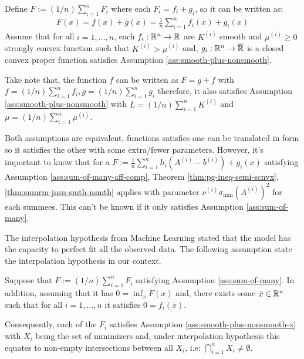 \documentclass[12pt]{article}
\begin{document}
    \begin{assumption}\label{ass:sum-of-many}
        Define $F := (1/n)\sum_{i = 1}^{n} F_i$ where each $F_i = f_i + g_i$, so it can be written as: 
        \begin{align*}
            F(x) = f(x) + g(x) = \frac{1}{n}\sum_{i = 1}^{n} f_i(x) + g_i(x)
        \end{align*}
        Assume that for all $i = 1, \ldots, n$, each $f_i:\mathbb R^n \rightarrow \mathbb R$ are $K^{(i)}$ smooth and $\mu^{(i)} \ge 0$ strongly convex function such that $K^{(i)} > \mu^{(i)}$ and, $g_i:\mathbb R^n \rightarrow \overline {\mathbb R}$ is a closed convex proper function satisfies Assumption \ref{ass:smooth-plus-nonsmooth}. 
        \par 
        Take note that, the function $f$ can be written as $F = g + f$ with $f = (1/n)\sum_{i = 1}^{n} f_i, g = (1/n)\sum_{i = 1}^{n}g_i$ therefore, it also satisfies Assumption \ref{ass:smooth-plus-nonsmooth} with $L = (1/n)\sum_{i = 1}^n K^{(i)}$ and $\mu = (1/n)\sum_{i = 1}^{n}\mu^{(i)}$. 
    \end{assumption}
    Both assumptions are equivalent, functions satisfies one can be translated in form so it satisfies the other with some extra/fewer parameters. 
    However, it's important to know that for a $F := \frac{1}{n}\sum_{i = 1}^{n} h_i(A^{(i)} - b^{(i)}) + g_i(x)$ satisfying Assumption \ref{ass:sum-of-many-aff-comp}, Theorem \ref{thm:pg-ineq-semi-scnvx}, \ref{thm:smnrm-jnsn-smth-nsmth} applies with parameter $\nu^{(i)}\sigma_{\min}(A^{(i)})^2$ for each summees. 
    This can't be known if it only satisfies Assumption \ref{ass:sum-of-many}. 
    \par
    The interpolation hypothesis from Machine Learning stated that the model has the capacity to perfect fit all the observed data. 
    The following assumption state the interpolation hypothesis in our context. 
    \begin{assumption}\label{ass:interp-hypothesis}
        Suppose that $F := (1/n)\sum_{i = 1}^{n} F_i$ satisfying Assumption \ref{ass:sum-of-many}. 
        In addition, assuming that it has $0 = \inf_{x}F(x)$ and, there exists some $\bar x \in \mathbb R^n$ such that for all $i = 1, \ldots, n$ it satisfies $0 = f_i(\bar x)$. 
        \par
        Consequently, each of the $F_i$ satisfies Assumption \ref{ass:smooth-plus-nonsmooth-x} with $X_i$ being the set of minimizers and, under interpolation hypothesis this equates to non-empty intersections between all $X_i$, i.e: $\bigcap_{i = 1}^n X_i \neq \emptyset$. 
    \end{assumption}
    
\end{document}
